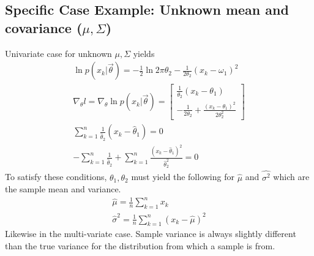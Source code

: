\documentclass[11pt]{article}
\begin{document}
\subsection{Specific Case Example: Unknown mean and covariance ($\mu, \Sigma$)}
Univariate case for unknown $\mu, \Sigma$ yields
\begin{eqnarray}
	\ln p(x_k | \vec{\theta}) = -\frac{1}{2} \ln 2\pi \theta_2 - \frac{1}{2\theta_2}(x_k - \omega_1)^2 \\
	\nabla _{\theta} l = \nabla _{\theta} \ln p(x_k | \vec{\theta}) =
	\left[
	\begin{array}{c}
		\frac{1}{\theta_2}(x_k - \theta_1) \\
		-\frac{1}{2\theta_2} + \frac{(x_k - \theta_1)^2}{2 \theta_2 ^2}
	\end{array}
	\right]  \label{gradient-gaussian-unknown-parameters} \\
	\sum_{k=1}^{n} \frac{1}{\hat{\theta}_2} (x_k - \hat{\theta} _1) = 0 \label{gradient-gaussian-unknown-parameters-maximum-cond1} \\
	- \sum _{k=1}^{n} \frac{1}{\hat{\theta}_2} + \sum_{k=1} ^n \frac{(x_k - \hat{\theta}_1 )^2}{\hat{\theta}_2 ^2} =0
	\label{gradient-gaussian-unknown-parameters-maximum-cond2}
\end{eqnarray}
To satisfy these conditions, $\theta_1, \theta_2$ must yield the following for $\hat{\mu}$ and $\hat{\sigma^2}$ which are the sample mean and variance. 
\begin{eqnarray}
	\hat{\mu} = \frac{1}{n} \sum _{k=1}^n x_k \\
	\hat{\sigma}^2 = \frac{1}{n} \sum _{k=1}^n (x_k - \hat{\mu})^2
\end{eqnarray}
Likewise in the multi-variate case.  Sample variance is always slightly different than the true variance for the distribution from which a sample is from.  
\end{document}
